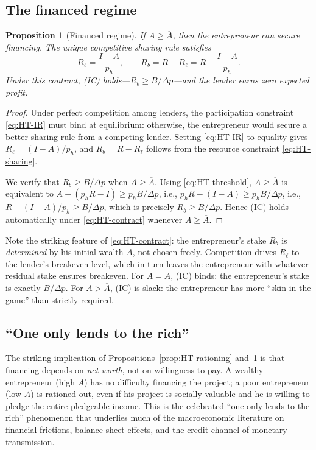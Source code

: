 \documentclass[11pt,a4paper,oneside]{book}
\def\geq{\geqslant}
\theoremstyle{plain}
\newtheorem{proposition}[theorem]{Proposition}
\theoremstyle{definition}
\theoremstyle{remark}
\numberwithin{equation}{chapter}
\begin{document}
\subsection{The financed regime}

\begin{proposition}[Financed regime]\label{prop:HT-financed}
If $A \geq \overline{A}$, then the entrepreneur can secure financing.
The unique competitive sharing rule satisfies
\begin{equation}\label{eq:HT-contract}
  R_\ell = \frac{I - A}{p_h},
  \qquad
  R_b = R - R_\ell = R - \frac{I - A}{p_h}.
\end{equation}
Under this contract, (IC) holds---$R_b \geq B/\Delta p$---and the lender earns zero expected profit.
\end{proposition}

\begin{proof}
Under perfect competition among lenders, the participation constraint \eqref{eq:HT-IR} must bind at equilibrium: otherwise, the entrepreneur would secure a better sharing rule from a competing lender.
Setting \eqref{eq:HT-IR} to equality gives $R_\ell = (I - A)/p_h$, and $R_b = R - R_\ell$ follows from the resource constraint \eqref{eq:HT-sharing}.

We verify that $R_b \geq B/\Delta p$ when $A \geq \overline{A}$.
Using \eqref{eq:HT-threshold}, $A \geq \overline{A}$ is equivalent to $A + (p_h R - I) \geq p_h B / \Delta p$, i.e., $p_h R - (I - A) \geq p_h B / \Delta p$, i.e., $R - (I - A)/p_h \geq B/\Delta p$, which is precisely $R_b \geq B/\Delta p$.
Hence (IC) holds automatically under \eqref{eq:HT-contract} whenever $A \geq \overline{A}$.
\end{proof}

Note the striking feature of \eqref{eq:HT-contract}: the entrepreneur's stake $R_b$ is \emph{determined} by his initial wealth $A$, not chosen freely.
Competition drives $R_\ell$ to the lender's breakeven level, which in turn leaves the entrepreneur with whatever residual stake ensures breakeven.
For $A = \overline{A}$, (IC) binds: the entrepreneur's stake is exactly $B/\Delta p$.
For $A > \overline{A}$, (IC) is slack: the entrepreneur has more ``skin in the game'' than strictly required.

\subsection{``One only lends to the rich''}

The striking implication of Propositions~\ref{prop:HT-rationing} and~\ref{prop:HT-financed} is that financing depends on \emph{net worth}, not on willingness to pay.
A wealthy entrepreneur (high $A$) has no difficulty financing the project; a poor entrepreneur (low $A$) is rationed out, even if his project is socially valuable and he is willing to pledge the entire pledgeable income.
This is the celebrated ``one only lends to the rich'' phenomenon that underlies much of the macroeconomic literature on financial frictions, balance-sheet effects, and the credit channel of monetary transmission.
\end{document}
